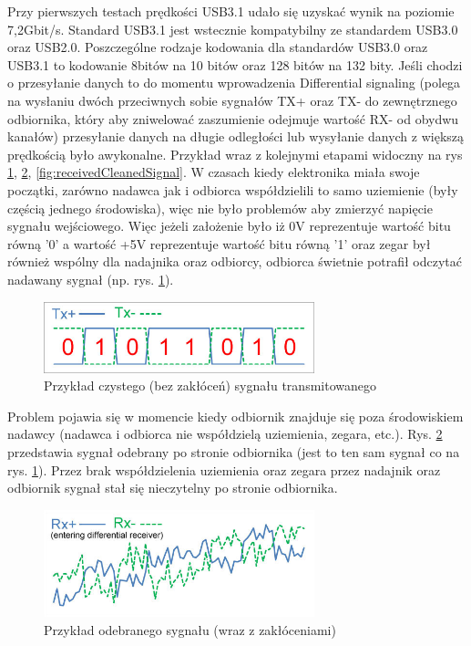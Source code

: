 \documentclass{BscUS}
\begin{document}
Przy pierwszych testach prędkości USB3.1 udało się uzyskać wynik na poziomie 7,2Gbit/s. Standard USB3.1 jest wstecznie kompatybilny ze standardem USB3.0 oraz USB2.0.
\cite{USB30Doc}
\newline
\indent Poszczególne rodzaje kodowania dla standardów USB3.0 oraz USB3.1 to kodowanie 8bitów na 10 bitów oraz 128 bitów na 132 bity. 
Jeśli chodzi o przesyłanie danych to do momentu wprowadzenia Differential signaling (polega na wysłaniu dwóch przeciwnych sobie sygnałów TX+ oraz TX- do zewnętrznego odbiornika, który aby zniwelować zaszumienie odejmuje wartość RX- od obydwu kanałów) przesyłanie danych na długie odległości lub wysyłanie danych z większą prędkością było awykonalne. Przykład wraz z kolejnymi etapami widoczny na rys \ref{fig:cleanSignal}, \ref{fig:receivedNoiseSignal}, \ref{fig:receivedCleanedSignal}.
\newline
\indent W czasach kiedy elektronika miała swoje początki, zarówno nadawca jak i odbiorca współdzielili to samo uziemienie (były częścią jednego środowiska), więc nie było problemów aby zmierzyć napięcie sygnału wejściowego. Więc jeżeli założenie było iż 0V reprezentuje wartość bitu równą '0' a wartość +5V reprezentuje wartość bitu równą '1' oraz zegar był również wspólny dla nadajnika oraz odbiorcy, odbiorca świetnie potrafił odczytać nadawany sygnał (np. rys. \ref{fig:cleanSignal}).
\begin{figure}[H]
\centering
\includegraphics[width=0.7\textwidth]{./img/cleanSignal}
\caption{Przykład czystego (bez zakłóceń) sygnału transmitowanego \cite{cleanSignal}}
\label{fig:cleanSignal}
\end{figure}
\noindent Problem pojawia się w momencie kiedy odbiornik znajduje się poza środowiskiem nadawcy (nadawca i odbiorca nie współdzielą uziemienia, zegara, etc.). Rys. \ref{fig:receivedNoiseSignal} przedstawia sygnał odebrany po stronie odbiornika (jest to ten sam sygnał co na rys. \ref{fig:cleanSignal}). Przez brak współdzielenia uziemienia oraz zegara przez nadajnik oraz odbiornik sygnał stał się nieczytelny po stronie odbiornika.
\begin{figure}[H]
\centering
\includegraphics[width=0.7\textwidth]{./img/receivedNoiseSignal}
\caption{Przykład odebranego sygnału (wraz z zakłóceniami) \cite{receivedNoiseSignal}}

\label{fig:receivedNoiseSignal}
\end{figure}
\end{document}
